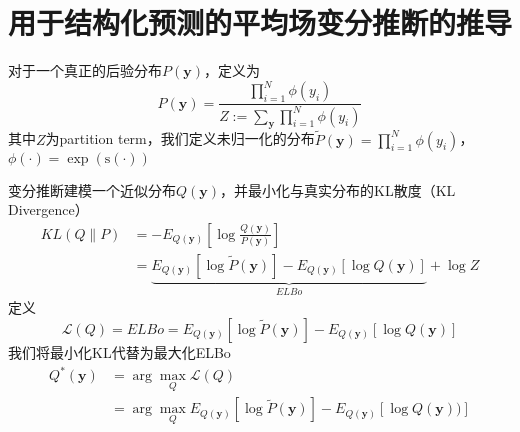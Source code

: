 \chapter{用于结构化预测的平均场变分推断的推导}
\label{appendix:mfvi-derivation}
对于一个真正的后验分布$P(\boldsymbol{y})$，定义为
\begin{equation}\label{eq:posterior}
  P(\boldsymbol{y}) =\frac{\prod_{i=1}^{N} \phi(y_i)}{Z:=\sum_{\boldsymbol{y}}\prod_{i=1}^{N} \phi(y_i)}
\end{equation}
其中$Z$为partition term，我们定义未归一化的分布$\tilde{P}(\boldsymbol{y})=\prod_{i=1}^{N} \phi(y_i)$，$\phi(\cdot)=\exp(\mathrm{s}(\cdot))$

变分推断建模一个近似分布$Q(\boldsymbol{y})$，并最小化与真实分布的KL散度（KL Divergence）
\begin{equation}
  \begin{split}
    KL(Q\|P)
    &=-E_{Q(\boldsymbol{y})}\left[\log\frac{Q(\boldsymbol{y})}{P(\boldsymbol{y})}\right]\\
    &=\underbrace{E_{Q(\boldsymbol{y})}\left[\log \tilde{P}(\boldsymbol{y})\right]-E_{Q(\boldsymbol{y})}\left[\log Q(\boldsymbol{y})\right]}_{ELBo}+\log Z
  \end{split}
\end{equation}
定义
\begin{equation}
  \mathcal{L}(Q)=ELBo=E_{Q(\boldsymbol{y})}\left[\log \tilde{P}(\boldsymbol{y})\right]-E_{Q(\boldsymbol{y})}\left[\log Q(\boldsymbol{y})\right]
\end{equation}
我们将最小化KL代替为最大化ELBo
\begin{equation}
  \begin{split}
    Q^{\ast}(\boldsymbol{y}) &= \arg\max_{Q}\mathcal{L}(Q)\\
    &= \arg\max_{Q}E_{Q(\boldsymbol{y})}\left[\log \tilde{P}(\boldsymbol{y})\right]-E_{Q(\boldsymbol{y})}\left[\log Q(\boldsymbol{y}))\right]
  \end{split}
\end{equation}


